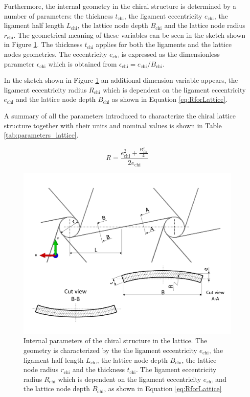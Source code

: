     \clearpage
    Furthermore, the internal geometry in the chiral structure is determined by a number of parameters: the thickness $t_{\mathrm{chi}}$, the ligament eccentricity $e_{\mathrm{chi}}$, the ligament half length $L_{\mathrm{chi}}$, the lattice node depth $B_{\mathrm{chi}}$ and the lattice node radius $r_{\mathrm{chi}}$. The geometrical meaning of these variables can be seen in the sketch shown in Figure \ref{fig:lattice-internalParameters}. The thickness $t_{\mathrm{chi}}$ applies for both the ligaments and the lattice nodes geometries. The eccentricity $e_{\mathrm{chi}}$ is expressed as the dimensionless parameter $\epsilon_{\mathrm{chi}}$ which is obtained from $\epsilon_{\mathrm{chi}} = e_{\mathrm{chi}} / B_{\mathrm{chi}}$.

    In the sketch shown in Figure \ref{fig:lattice-internalParameters} an additional dimension variable appears, the ligament eccentricity radius $R_{\mathrm{chi}}$ which is dependent on the ligament eccentricity $e_{\mathrm{chi}}$ and the lattice node depth $B_{\mathrm{chi}}$ as shown in Equation \ref{eq:RforLattice}.

    A summary of all the parameters introduced to characterize the chiral lattice structure together with their units and nominal values is shown in Table \ref{tab:parameters_lattice}.

    \begin{equation}\label{eq:RforLattice}
      R = \frac{e_{\mathrm{chi}}^2 + \frac{B_{\mathrm{chi}}^2}{4}}{2e_{\mathrm{chi}}}
    \end{equation}

    \begin{figure}[!htpb]
      \centering
      \includegraphics[width=0.8 \textwidth]{figures/model/lattice-internalParameters}
      \caption[Internal parameters of the chiral structure in the lattice]{Internal parameters of the chiral structure in the lattice. The geometry is characterized by the the ligament eccentricity $e_{\mathrm{chi}}$, the ligament half length $L_{\mathrm{chi}}$, the lattice node depth $B_{\mathrm{chi}}$, the lattice node radius $r_{\mathrm{chi}}$ and the thickness $t_{\mathrm{chi}}$. The ligament eccentricity radius $R_{\mathrm{chi}}$ which is dependent on the ligament eccentricity $e_{\mathrm{chi}}$ and the lattice node depth $B_{\mathrm{chi}}$, as shown in Equation \ref{eq:RforLattice}}\label{fig:lattice-internalParameters}
    \end{figure}

